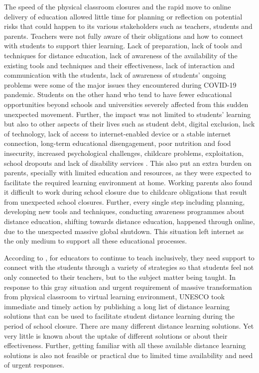\documentclass[11pt,a4paper,]{article}
\begin{document}
The speed of the physical classroom closures and the rapid move to online delivery of education allowed little time for planning or reflection on potential risks that could happen to its various stakeholders such as teachers, students and parents. Teachers were not fully aware of their obligations and how to connect with students to support thier learning. Lack of preparation, lack of tools and techniques for distance education, lack of awareness of the availability of the existing tools and techniques and their effectiveness, lack of interaction and communication with the students, lack of awareness of students' ongoing problems were some of the major issues they encountered during COVID-19 pandemic. Students on the other hand who tend to have fewer educational opportunities beyond schools and universities severely affected from this sudden unexpected movement. Further, the impact was not limited to students' learning but also to other aspects of their lives such as student debt, digital exclusion, lack of technology, lack of access to internet-enabled device or a stable internet connection, long-term educational disengagement, poor nutrition and food insecurity, increased psychological challenges, childcare problems, exploitation, school dropouts and lack of disability services \autocite{drane2020impact,daniel2020education,unescoadverse2020,richmond2020critical,carter2021teacher}. This also put an extra burden on parents, specially with limited education and resources, as they were expected to facilitate the required learning environment at home. Working parents also found it difficult to work during school closure due to childcare obligations that result from unexpected school closures. Further, every single step including planning, developing new tools and techniques, conducting awareness programmes about distance education, shifting towards distance education, happened through online, due to the unexpected massive global shutdown. This situation left internet as the only medium to support all these educational processes.

According to \textcite{carter2021teacher}, for educators to continue to teach inclusively, they need support to connect with the students through a variety of strategies so that students feel not only connected to their teachers, but to the subject matter being taught. In response to this gray situation and urgent requirement of massive transformation from physical classroom to virtual learning environment, UNESCO took immediate and timely action by publishing a long list of distance learning solutions that can be used to facilitate student distance learning during the period of school closure. There are many different distance learning solutions. Yet very little is known about the uptake of different solutions or about their effectiveness. Further, getting familiar with all these available distance learning solutions is also not feasible or practical due to limited time availability and need of urgent responses.
\end{document}
